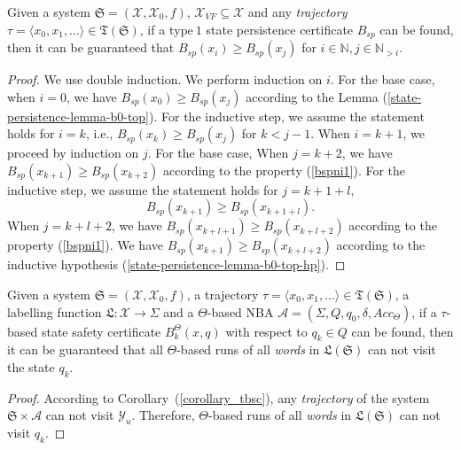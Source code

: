 \documentclass[acmlarge]{acmart}
\begin{document}
\begin{lemma}
  \label{state-peristence-lemma-non-increase}
  Given a system $\mathfrak{S}=(\mathcal{X}, \mathcal{X}_0, f)$, $\mathcal{X}_{VF} \subseteq \mathcal{X}$ and any \emph{trajectory} $\tau  = \langle x_0, x_1, \dots \rangle \in \mathfrak{T}(\mathfrak{S})$, 
  if a $\mathrm{type~1}$ state persistence certificate $B_{sp}$ can be found, 
  then it can be guaranteed that $B_{sp}(x_i) \geq B_{sp}(x_j)$ for $i \in \mathbb{N}, j \in \mathbb{N}_{>i}$.
\end{lemma}
\begin{proof}
  We use double induction. 
  We perform induction on $i$. 
  For the base case, when $i = 0$, we have $B_{sp}(x_0) \geq B_{sp}(x_j)$ according to the Lemma (\ref{state-persistence-lemma-b0-top}).
  For the inductive step, we assume the statement holds for $i = k$, i.e., $B_{sp}(x_k) \geq B_{sp}(x_j)$ for $k < j-1$. 
  When $i = k+1$,  we proceed by induction on $j$.
  For the base case, When $j = k + 2$, we have $B_{sp}(x_{k+1}) \geq B_{sp}(x_{k+2})$ according to the property (\ref{bspni1}).
  For the inductive step, we assume the statement holds for $j=k+1+l$,
  \begin{equation}
  B_{sp}(x_{k+1}) \geq B_{sp}(x_{k+1+l}).
  \label{state-persistence-lemma-b0-top-hp}
  \end{equation} 
  When $j = k + l + 2$, we have $B_{sp}(x_{k+l+1}) \geq B_{sp}(x_{k+l+2})$ according to the property (\ref{bspni1}). 
  We have $B_{sp}(x_{k+1}) \geq B_{sp}(x_{k+l+2})$ according to the inductive hypothesis (\ref{state-persistence-lemma-b0-top-hp}). 
\end{proof}

\begin{theorem}
  \label{state-safety-lemma}
  Given a system $\mathfrak{S} = (\mathcal{X}, \mathcal{X}_0, f)$, a trajectory $\tau=\langle x_0, x_1, \dots \rangle \in \mathfrak{T}(\mathfrak{S})$, a labelling function $\mathfrak{L}:\mathcal{X} \rightarrow \Sigma$ and a $\Theta$-based NBA $\mathcal{A}=(\Sigma, Q, q_0, \delta, Acc_{\Theta})$, if a $\tau$-based state safety certificate \(B^{\Theta}_{k}(x, q)\) with respect to $q_k \in Q$ can be found, then it can be guaranteed that all $\Theta$-based runs of all \emph{words} in $\mathfrak{L}(\mathfrak{S})$ can not visit the state $q_k$.
\end{theorem}

\begin{proof}
  According to Corollary~(\ref{corollary_tbsc}), any \emph{trajectory} of the system $\mathfrak{S} \times \mathcal{A}$ can not visit $\mathcal{Y}_u$. Therefore, $\Theta$-based runs of all \emph{words} in $\mathfrak{L}(\mathfrak{S})$ can not visit $q_k$.
\end{proof}
\end{document}
